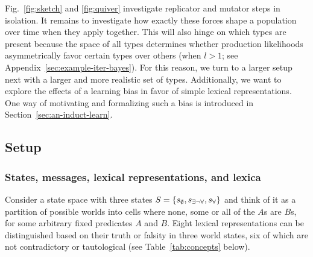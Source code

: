 \documentclass[a4paper, 11pt]{article}
\theoremstyle{Satz}
\newcommand{\set}[1]{\left\{#1\right\}}
\newcommand{\States}{\ensuremath{S}\xspace}		%
\newcommand{\state}{\ensuremath{s}\xspace}		%
\newcommand{\mystate}[1]{\ensuremath{\state_{\text{#1}}}\xspace} %
\newcommand{\ssome}{\mystate{\ensuremath{\exists\neg\forall}}}
\newcommand{\sall}{\mystate{\ensuremath{\forall}}}
\newcommand{\snone}{\mystate{\ensuremath{\emptyset}}}
\begin{document}
Fig.~\ref{fig:sketch} and \ref{fig:quiver} investigate replicator and mutator steps in
isolation. It remains to investigate how exactly these forces shape a population over time when
they apply together. This will also hinge on which types are present because the space of all
types determines whether production likelihoods asymmetrically favor certain types over others
(when $l>1$; see Appendix~\ref{sec:example-iter-bayes}). For this reason, we turn to a larger
setup next with a larger and more realistic set of types. Additionally, we want to explore
the effects of a learning bias in favor of simple lexical representations. One way of
motivating and formalizing such a bias is introduced in Section~\ref{sec:an-induct-learn}.



\subsection{Setup}
\label{sec:setup:-stat-conc}


\subsubsection{States, messages, lexical representations, and lexica} 
\label{sec:stat-mess-conc}

Consider a state space with three states $\States = \set{\snone, \ssome, \sall}$ and think of
it as a partition of possible worlds into cells where none, some or all of the $A$s are $B$s,
for some arbitrary fixed predicates $A$ and $B$. Eight lexical representations can be
distinguished based on their truth or falsity in three world states, six of which are not
contradictory or tautological (see Table~\ref{tab:concepts} below).
\end{document}
